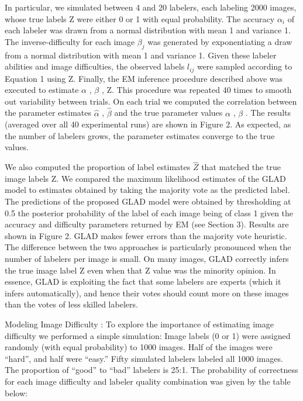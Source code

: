 \documentclass[
]{article}
\begin{document}
In particular, we simulated between 4 and 20 labelers, each labeling
2000 images, whose true labels Z were either 0 or 1 with equal
probability. The accuracy \(\alpha_{i}\) of each labeler was drawn from
a normal distribution with mean 1 and variance 1. The inverse-difficulty
for each image \(\beta_{j}\) was generated by exponentiating a draw from
a normal distribution with mean 1 and variance 1. Given these labeler
abilities and image difficulties, the observed labels \(l_{ij}\) were
sampled according to Equation 1 using Z. Finally, the EM inference
procedure described above was executed to estimate \(\alpha\) ,
\(\beta\) , Z. This procedure was repeated 40 times to smooth out
variability between trials. On each trial we computed the correlation
between the parameter estimates \(\hat{\alpha}\) , \(\hat{\beta}\) and
the true parameter values \(\alpha\) , \(\beta\) . The results (averaged
over all 40 experimental runs) are shown in Figure 2. As expected, as
the number of labelers grows, the parameter estimates converge to the
true values.

We also computed the proportion of label estimates \(\hat{Z}\) that
matched the true image labels Z. We compared the maximum likelihood
estimates of the GLAD model to estimates obtained by taking the majority
vote as the predicted label. The predictions of the proposed GLAD model
were obtained by thresholding at 0.5 the posterior probability of the
label of each image being of class 1 given the accuracy and difficulty
parameters returned by EM (see Section 3). Results are shown in Figure
2. GLAD makes fewer errors than the majority vote heuristic. The
difference between the two approaches is particularly pronounced when
the number of labelers per image is small. On many images, GLAD
correctly infers the true image label Z even when that Z value was the
minority opinion. In essence, GLAD is exploiting the fact that some
labelers are experts (which it infers automatically), and hence their
votes should count more on these images than the votes of less skilled
labelers.

Modeling Image Difficulty : To explore the importance of estimating
image difficulty we performed a simple simulation: Image labels (0 or 1)
were assigned randomly (with equal probability) to 1000 images. Half of
the images were ``hard'', and half were ``easy.'' Fifty simulated
labelers labeled all 1000 images. The proportion of ``good'' to ``bad''
labelers is 25:1. The probability of correctness for each image
difficulty and labeler quality combination was given by the table below:
\end{document}
